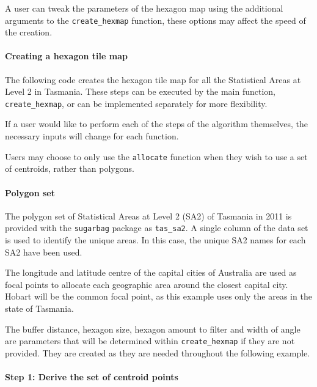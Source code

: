 A user can tweak the parameters of the hexagon map using the additional
arguments to the \texttt{create\_hexmap} function, these options may
affect the speed of the creation.

\hypertarget{creating-a-hexagon-tile-map}{%
\paragraph{Creating a hexagon tile
map}\label{creating-a-hexagon-tile-map}}

The following code creates the hexagon tile map for all the Statistical
Areas at Level 2 in Tasmania. These steps can be executed by the main
function, \texttt{create\_hexmap}, or can be implemented separately for
more flexibility.

If a user would like to perform each of the steps of the algorithm
themselves, the necessary inputs will change for each function.

Users may choose to only use the \texttt{allocate} function when they
wish to use a set of centroids, rather than \citep{sf} polygons.

\hypertarget{polygon-set}{%
\paragraph{Polygon set}\label{polygon-set}}

The polygon set of Statistical Areas at Level 2 (SA2) \citep{abs2011} of
Tasmania in 2011 is provided with the \texttt{sugarbag} package as
\texttt{tas\_sa2}. A single column of the data set is used to identify
the unique areas. In this case, the unique SA2 names for each SA2 have
been used.

The longitude and latitude centre of the capital cities of Australia are
used as focal points to allocate each geographic area around the closest
capital city. Hobart will be the common focal point, as this example
uses only the areas in the state of Tasmania.

The buffer distance, hexagon size, hexagon amount to filter and width of
angle are parameters that will be determined within
\texttt{create\_hexmap} if they are not provided. They are created as
they are needed throughout the following example.

\hypertarget{step-1-derive-the-set-of-centroid-points}{%
\paragraph{Step 1: Derive the set of centroid
points}\label{step-1-derive-the-set-of-centroid-points}}

